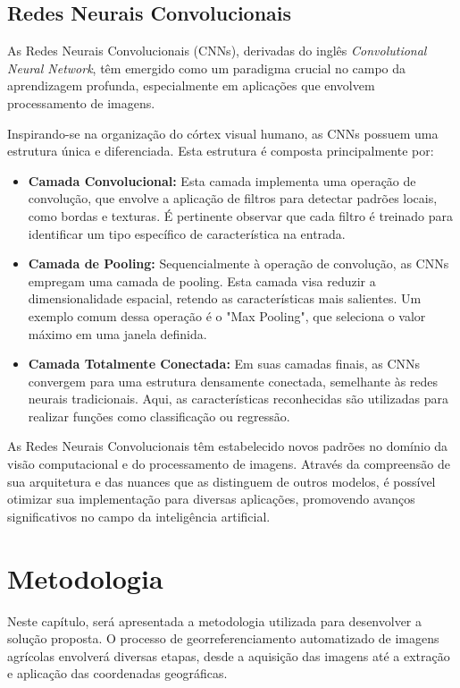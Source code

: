 \documentclass[conference]{IEEEtran}
\begin{document}
\subsection{Redes Neurais Convolucionais}
As Redes Neurais Convolucionais (CNNs), derivadas do inglês \emph{Convolutional Neural Network}, 
têm emergido como um paradigma crucial no campo da aprendizagem profunda, especialmente em aplicações 
que envolvem processamento de imagens.

Inspirando-se na organização do córtex visual humano, as CNNs possuem uma estrutura única e 
diferenciada. Esta estrutura é composta principalmente por:
\begin{itemize}
    \item {\textbf{Camada Convolucional:}}
    Esta camada implementa uma operação de convolução, que envolve a aplicação de filtros para 
    detectar padrões locais, como bordas e texturas. É pertinente observar que cada filtro é treinado 
    para identificar um tipo específico de característica na entrada.

    \item {\textbf{Camada de Pooling:}}
    Sequencialmente à operação de convolução, as CNNs empregam uma camada de pooling. Esta camada 
    visa reduzir a dimensionalidade espacial, retendo as características mais salientes. 
    Um exemplo comum dessa operação é o "Max Pooling", que seleciona o valor máximo em uma janela definida.

    \item {\textbf{Camada Totalmente Conectada:}}
     Em suas camadas finais, as CNNs convergem para uma estrutura densamente conectada, semelhante 
     às redes neurais tradicionais. Aqui, as características reconhecidas são utilizadas para realizar 
     funções como classificação ou regressão.
\end{itemize}

As Redes Neurais Convolucionais têm estabelecido novos padrões no domínio da visão computacional e 
do processamento de imagens. Através da compreensão de sua arquitetura e das nuances que as 
distinguem de outros modelos, é possível otimizar sua implementação para diversas aplicações, 
promovendo avanços significativos no campo da inteligência artificial.

\section{Metodologia}
Neste capítulo, será apresentada a metodologia utilizada para desenvolver a solução proposta. 
O processo de georreferenciamento automatizado de imagens agrícolas envolverá diversas etapas, 
desde a aquisição das imagens até a extração e aplicação das coordenadas geográficas. 
\end{document}
